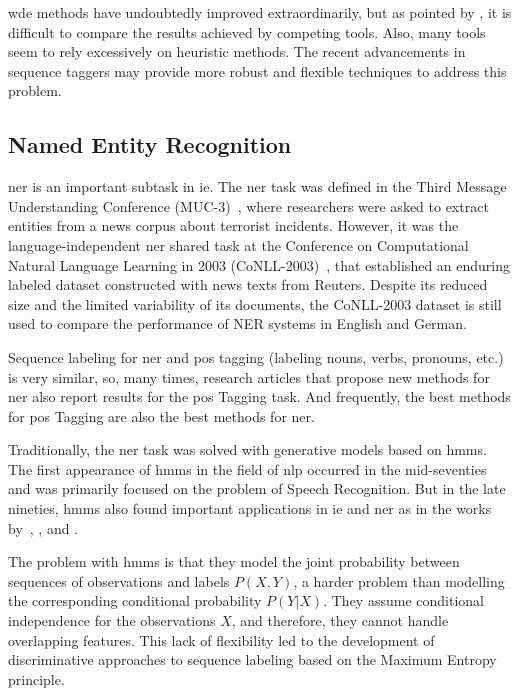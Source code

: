 \documentclass{nle}
\begin{document}
\gls{wde} methods have undoubtedly improved extraordinarily, but
as pointed by \cite{Schulz2016}, it is difficult to compare the results 
achieved by competing tools. Also, many tools seem to rely excessively on heuristic methods.
The recent advancements in sequence taggers may provide more robust and flexible techniques
to address this problem.


\subsection{Named Entity Recognition}
\label{sec:ner}

\gls{ner} is an important subtask in \gls{ie}.
The \gls{ner} task was defined in the Third Message 
Understanding Conference (MUC-3)~\cite{Sundheim1991}, where researchers were asked to extract
entities from a news corpus about terrorist incidents. However, it was the 
language-independent \gls{ner} shared task at the Conference 
on Computational Natural Language Learning in 2003 ({CoNLL-2003})~\cite{KimSang2003},
that established an enduring labeled dataset constructed with news texts from Reuters.
Despite its reduced size and the limited variability of its documents, the {CoNLL-2003}
dataset is still used to compare the performance of NER systems in English and 
German. 

Sequence labeling for \gls{ner} and \gls{pos} tagging (labeling nouns, verbs, pronouns, etc.) 
is very similar, so, many times, research articles that propose new methods for \gls{ner}
also report results for the \gls{pos} Tagging task. And frequently, the best methods for 
\gls{pos} Tagging are also the best methods for \gls{ner}.

Traditionally, the \gls{ner} task was solved with generative models based on 
\gls{hmm}s. The first appearance of \gls{hmm}s in the
field of \gls{nlp} occurred in the mid-seventies and was
primarily focused on the problem of Speech Recognition. 
But in the late nineties, \gls{hmm}s also found important applications in \gls{ie}
and \gls{ner} as in the works by~\cite{Bikel1999}, 
\cite{Freitag1999}, and \cite{Freitag2000}.

The problem with \gls{hmm}s is that they model the joint probability between 
sequences of observations and labels $ P(X, Y) $, a harder problem than modelling the corresponding 
conditional probability $ P(Y|X) $. They assume conditional independence for the observations $ X $, and
therefore, they cannot handle overlapping features. This lack of flexibility led to the 
development of discriminative approaches to sequence labeling based on the Maximum Entropy principle.
\end{document}
